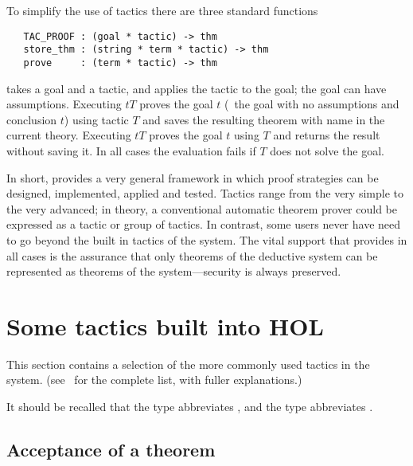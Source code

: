 To simplify the use of tactics there are three standard functions

\begin{holboxed}\begin{verbatim}
   TAC_PROOF : (goal * tactic) -> thm
   store_thm : (string * term * tactic) -> thm
   prove     : (term * tactic) -> thm
\end{verbatim}\end{holboxed}

\noindent {} takes a goal and a tactic, and applies the
tactic to the goal; the goal can have assumptions.  Executing
$t$\ml{,}$T$\ml{)} proves the goal
\ml{([],}$t$\ml{)} (\ie\ the goal with no assumptions and conclusion
$t$) using tactic $T$ and saves the resulting theorem with name
 in the current theory.  Executing
$t$\ml{,}$T$\ml{)} proves the goal \ml{([],}$t$\ml{)} using
$T$ and returns the result without saving it. In all cases the
evaluation fails if $T$ does not solve the goal.

In short, \HOL{} provides a very general framework in which proof
strategies can be designed, implemented, applied and tested.  Tactics
range from the very simple to the very advanced; in theory, a
conventional automatic theorem prover could be expressed as a tactic or group
of tactics.  In contrast, some users never have need to go beyond the
built in tactics of the system.  The vital support that \HOL{} provides
in all cases is the assurance that only theorems of the deductive system
can be represented as theorems of the \HOL{} system---security is
always preserved.

\section{Some tactics built into HOL}

This section contains a selection of the more commonly
used tactics in the \HOL{} system. (see \REFERENCE\
for the complete list, with fuller explanations.)

It should be recalled that the \ML{} type  abbreviates
\ml{thm->tactic}, and the type \ml{conv} abbreviates \ml{term->thm}.

\subsection{Acceptance of a theorem}


